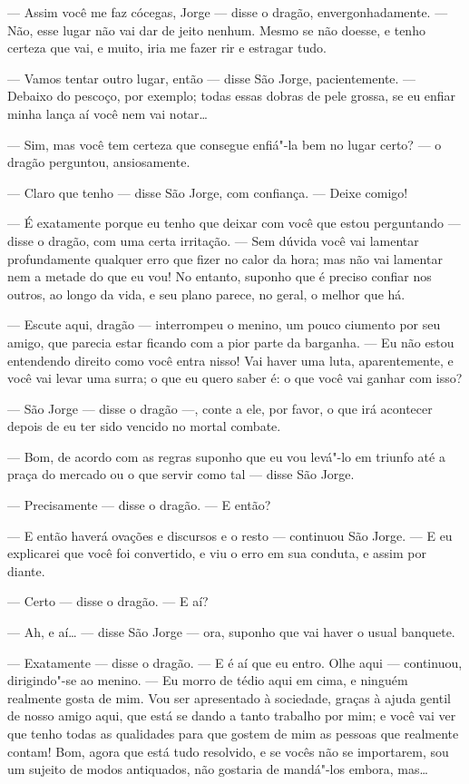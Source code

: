 --- Assim você me faz cócegas, Jorge --- disse o dragão,
envergonhadamente. --- Não, esse lugar não vai dar de jeito nenhum.
Mesmo se não doesse, e tenho certeza que vai, e muito, iria me fazer
rir e estragar tudo.

--- Vamos tentar outro lugar, então --- disse São Jorge, pacientemente. ---
Debaixo do pescoço, por exemplo; todas essas dobras de pele grossa,
se eu enfiar minha lança aí você nem vai notar\ldots{}

--- Sim, mas você tem certeza que consegue enfiá"-la bem no lugar certo?
--- o dragão perguntou, ansiosamente.

--- Claro que tenho --- disse São Jorge, com confiança. --- Deixe comigo! 

--- É exatamente porque eu tenho que deixar com você que estou
perguntando --- disse o dragão, com uma certa irritação. --- Sem dúvida
você vai lamentar profundamente qualquer erro que fizer no calor da
hora; mas não vai lamentar nem a metade do que eu vou! No entanto,
suponho que é preciso confiar nos outros, ao longo da vida, e seu
plano parece, no geral, o melhor que há.

--- Escute aqui, dragão --- interrompeu o menino, um pouco ciumento por
seu amigo, que parecia estar ficando com a pior parte da barganha. ---
Eu não estou entendendo direito como você entra nisso! Vai haver uma
luta, aparentemente, e você vai levar uma surra; o que eu quero saber
é: o que você vai ganhar com isso?

--- São Jorge --- disse o dragão ---, conte a ele, por favor, o que irá
acontecer depois de eu ter sido vencido no mortal combate.

--- Bom, de acordo com as regras suponho que eu vou levá"-lo em triunfo
até a praça do mercado ou o que servir como tal --- disse São Jorge.

--- Precisamente --- disse o dragão. --- E então?

--- E então haverá ovações e discursos e o resto --- continuou São Jorge.
--- E eu explicarei que você foi convertido, e viu o erro em sua
conduta, e assim por diante.

--- Certo --- disse o dragão. --- E aí?

--- Ah, e aí\ldots{} --- disse São Jorge --- ora, suponho que vai haver o usual
banquete.

--- Exatamente --- disse o dragão. --- E é aí que eu entro. Olhe aqui ---
continuou, dirigindo"-se ao menino. --- Eu morro de tédio aqui em cima,
e ninguém realmente gosta de mim. Vou ser apresentado à sociedade,
graças à ajuda gentil de nosso amigo aqui, que está se dando a tanto
trabalho por mim; e você vai ver que tenho todas as qualidades para
que gostem de mim as pessoas que realmente contam! Bom, agora que
está tudo resolvido, e se vocês não se importarem, sou um sujeito de
modos antiquados, não gostaria de mandá"-los embora, mas\ldots{}

